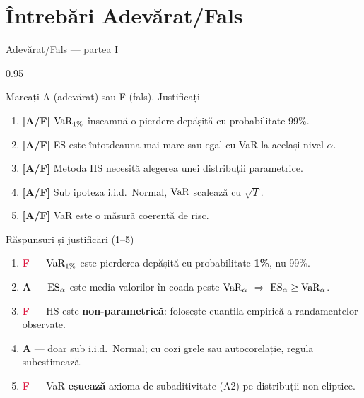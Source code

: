 \documentclass[9pt, aspectratio=169, t]{beamer}
\begin{document}
\section{Întrebări Adevărat/Fals}

\begin{frame}[shrink=10]{Adevărat/Fals --- partea I}
\begin{cminipage}{0.95\textwidth}
\begin{block}{Marcați A (adevărat) sau F (fals). Justificați}
\begin{enumerate}\setlength{\itemsep}{1pt}
    \item \textbf{[A/F]} $\text{VaR}_{1\%}$ înseamnă o pierdere depășită cu probabilitate 99\%.
    \item \textbf{[A/F]} ES este întotdeauna mai mare sau egal cu VaR la același nivel $\alpha$.
    \item \textbf{[A/F]} Metoda HS necesită alegerea unei distribuții parametrice.
    \item \textbf{[A/F]} Sub ipoteza i.i.d.\ Normal, $\text{VaR}$ scalează cu $\sqrt{T}$.
    \item \textbf{[A/F]} VaR este o măsură coerentă de risc.
\end{enumerate}
\end{block}
\vspace{0.15cm}
\begin{exampleblock}{Răspunsuri și justificări (1--5)}
\begin{enumerate}\setlength{\itemsep}{0pt}
    \item \textcolor{Crimson}{\textbf{F}} --- $\text{VaR}_{1\%}$ este pierderea depășită cu probabilitate \textbf{1\%}, nu 99\%.
    \item \textcolor{Forest}{\textbf{A}} --- $\text{ES}_\alpha$ este media valorilor în coada peste $\text{VaR}_\alpha$ $\Rightarrow$ $\text{ES}_\alpha \geq \text{VaR}_\alpha$.
    \item \textcolor{Crimson}{\textbf{F}} --- HS este \textbf{non-parametrică}: folosește cuantila empirică a randamentelor observate.
    \item \textcolor{Forest}{\textbf{A}} --- doar sub i.i.d.\ Normal; cu cozi grele sau autocorelație, regula subestimează.
    \item \textcolor{Crimson}{\textbf{F}} --- VaR \textbf{eșuează} axioma de subaditivitate (A2) pe distribuții non-eliptice.
\end{enumerate}
\end{exampleblock}
\end{cminipage}
\end{frame}
\end{document}
